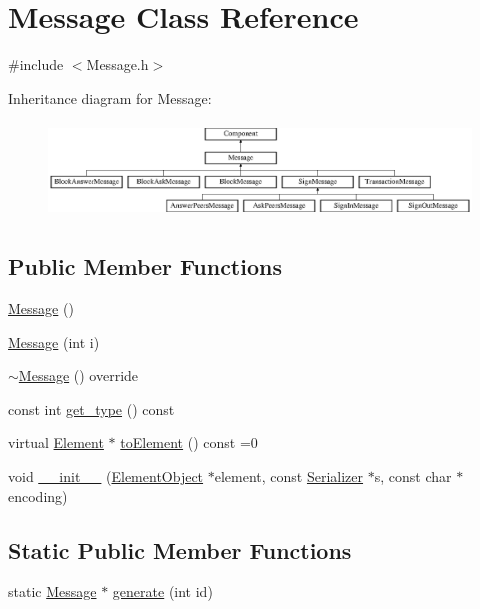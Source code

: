 \hypertarget{classMessage}{}\section{Message Class Reference}
\label{classMessage}


{\ttfamily \#include $<$Message.\+h$>$}

Inheritance diagram for Message\+:\begin{figure}[H]
\begin{center}
\leavevmode
\includegraphics[height=2.539683cm]{classMessage}
\end{center}
\end{figure}
\subsection*{Public Member Functions}
\begin{DoxyCompactItemize}
\item 
\mbox{\hyperlink{classMessage_a4fc4f717b634e66070366cb7722d7761}{Message}} ()
\item 
\mbox{\hyperlink{classMessage_a6819ef42fb87c15b413b142eb96fe536}{Message}} (int i)
\item 
\mbox{\hyperlink{classMessage_aefaeef0caed942ae0920bea838065b0a}{$\sim$\+Message}} () override
\item 
const int \mbox{\hyperlink{classMessage_a2a576dcffd45c4574fcdf2897ec26086}{get\+\_\+type}} () const
\item 
virtual \mbox{\hyperlink{classElement}{Element}} $\ast$ \mbox{\hyperlink{classComponent_a3e63d8c993e417a4af3f56d65ebfc7ea}{to\+Element}} () const =0
\item 
void \mbox{\hyperlink{classComponent_a28212595f8ee85fe009bd233bc99b2fc}{\+\_\+\+\_\+init\+\_\+\+\_\+}} (\mbox{\hyperlink{classElementObject}{Element\+Object}} $\ast$element, const \mbox{\hyperlink{classSerializer}{Serializer}} $\ast$s, const char $\ast$encoding)
\end{DoxyCompactItemize}
\subsection*{Static Public Member Functions}
\begin{DoxyCompactItemize}
\item 
static \mbox{\hyperlink{classMessage}{Message}} $\ast$ \mbox{\hyperlink{classMessage_ad92a0e1cfa5b5a503ec9c61833e3e5ea}{generate}} (int id)
\end{DoxyCompactItemize}
